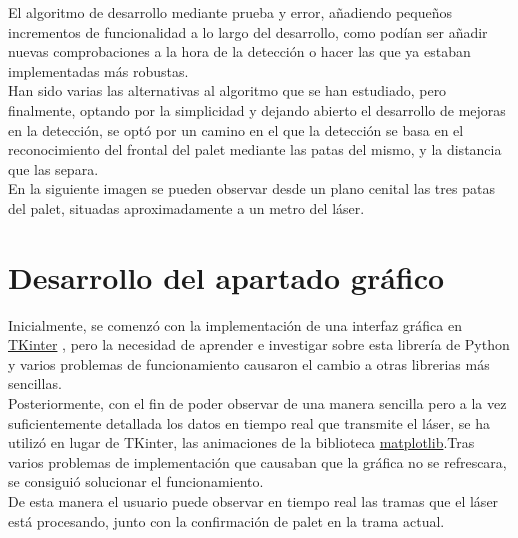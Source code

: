 		El algoritmo de desarrollo mediante prueba y error, añadiendo pequeños incrementos de funcionalidad a lo largo del desarrollo, como podían ser añadir nuevas comprobaciones a la hora de la detección o hacer las que ya estaban implementadas más robustas.\\

		Han sido varias las alternativas al algoritmo que se han estudiado, pero finalmente, optando por la simplicidad y dejando abierto el desarrollo de mejoras en la detección, se optó por un camino en el que la detección se basa en el reconocimiento del frontal del palet mediante las patas del mismo, y la distancia que las separa.\\
En la siguiente imagen se pueden observar desde un plano cenital las tres patas del palet, situadas aproximadamente a un metro del láser.




\section{Desarrollo del apartado gráfico}

		Inicialmente, se comenzó con la implementación de una interfaz gráfica en \href{https://docs.python.org/2/library/tkinter.html}{TKinter}
, pero la necesidad de aprender e investigar sobre esta librería de Python y varios problemas de funcionamiento causaron el cambio a otras librerias más sencillas.\\
Posteriormente, con el fin de poder observar de una manera sencilla pero a la vez suficientemente detallada los datos en tiempo real que transmite el láser, se ha utilizó en lugar de TKinter, las animaciones de la biblioteca \href{https://matplotlib.org/}{matplotlib}.Tras varios problemas de implementación que causaban que la gráfica no se refrescara, se consiguió solucionar el funcionamiento.\\ De esta manera el usuario puede observar en tiempo real las tramas que el láser está procesando, junto con la confirmación de palet en la trama actual. 







